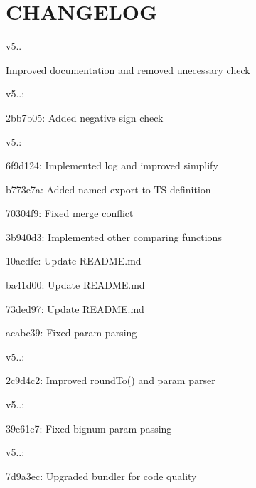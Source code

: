 \chapter{CHANGELOG }
\hypertarget{md_frontend_2node__modules_2fraction_8js_2CHANGELOG}{}\label{md_frontend_2node__modules_2fraction_8js_2CHANGELOG}
\label{md_frontend_2node__modules_2fraction_8js_2CHANGELOG_autotoc_md1230}%
%


v5..
\begin{DoxyItemize}
\item Improved documentation and removed unecessary check
\end{DoxyItemize}

v5..:\+
\begin{DoxyItemize}
\item 2bb7b05:\+ Added negative sign check
\end{DoxyItemize}

v5.:\+
\begin{DoxyItemize}
\item 6f9d124:\+ Implemented log and improved simplify
\item b773e7a:\+ Added named export to TS definition
\item 70304f9:\+ Fixed merge conflict
\item 3b940d3:\+ Implemented other comparing functions
\item 10acdfc:\+ Update README.\+md
\item ba41d00:\+ Update README.\+md
\item 73ded97:\+ Update README.\+md
\item acabc39:\+ Fixed param parsing
\end{DoxyItemize}

v5..:\+
\begin{DoxyItemize}
\item 2c9d4c2:\+ Improved round\+To() and param parser
\end{DoxyItemize}

v5..:\+
\begin{DoxyItemize}
\item 39e61e7:\+ Fixed bignum param passing
\end{DoxyItemize}

v5..:\+
\begin{DoxyItemize}
\item 7d9a3ec:\+ Upgraded bundler for code quality
\end{DoxyItemize}

